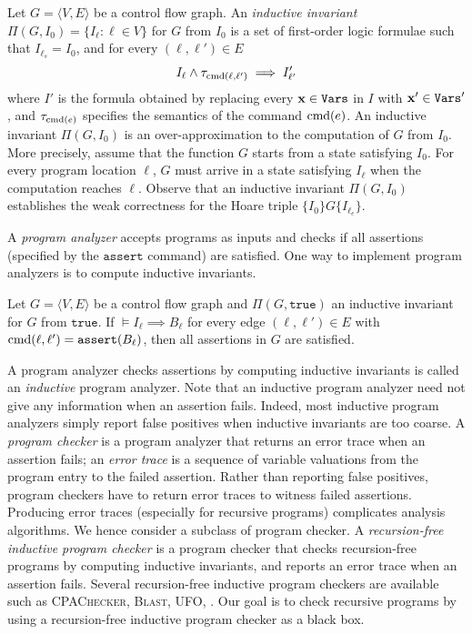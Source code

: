 Let $G = \langle V, E \rangle$ be a control flow graph.
An \emph{inductive invariant} $\Pi (G, I_0) = \{ I_\ell : \ell \in V
\}$ for $G$ from $I_0$ is a set of first-order logic formulae such
that $I_{\ell_s} = I_0$, and for every $(\ell, \ell') \in E$
\begin{equation*}
I_{\ell} \wedge \tau_{\textmd{cmd}(\ell, \ell')} \implies I'_{\ell'}
\end{equation*}
where $I'$ is the formula obtained by replacing every $\textbf{x} \in
\mathtt{Vars}$ in $I$ with $\textbf{x}' \in \mathtt{Vars}'$, and
$\tau_{\textmd{cmd} (e)}$ specifies the semantics of the command
$\textmd{cmd} (e)$. An inductive invariant $\Pi (G, I_0)$ is an
over-approximation to the computation of $G$ from $I_0$. More
precisely, assume that the function $G$ starts from a state satisfying
$I_0$. For every program location $\ell$, $G$ must arrive in a state
satisfying $I_{\ell}$ when the computation reaches $\ell$. Observe
that an inductive invariant $\Pi (G, I_0)$ establishes the weak
correctness for the Hoare triple $\{ I_0 \} G \{ I_{\ell_e} \}$.

A \emph{program analyzer} accepts programs as inputs and
checks if all assertions (specified by the $\mathtt{assert}$ command)
are satisfied. One way to implement program analyzers is to compute
inductive invariants. 
\begin{proposition}
Let $G = \langle V, E \rangle$ be a control flow
graph and $\Pi (G, \mathtt{true})$ an inductive invariant for $G$ from
$\mathtt{true}$. If $\models I_{\ell} \implies B_{\ell}$ for every
edge $(\ell, \ell') \in E$ with $\textmd{cmd} (\ell, \ell') =
\mathtt{assert} (B_{\ell})$, then all assertions in $G$ are satisfied.
\end{proposition}
A program analyzer checks assertions by computing inductive invariants
is called an \emph{inductive} program analyzer. Note that an inductive
program analyzer need not give any information when an assertion fails. 
Indeed, most inductive program analyzers simply report false positives
when inductive invariants are too coarse. A \emph{program checker} is
a program analyzer that returns an error trace when an assertion
fails; an \emph{error trace} is a sequence of variable valuations from
the program entry to the failed assertion. Rather than reporting false
positives, program checkers have to return error traces to witness 
failed assertions. Producing error traces (especially for recursive
programs) complicates analysis algorithms. We hence consider a
subclass of program checker. A \emph{recursion-free
  inductive program checker} is a program checker that checks
recursion-free programs by computing inductive invariants, and reports
an error trace when an assertion fails. Several recursion-free
inductive program checkers are available such as \textsc{CPAChecker},
\textsc{Blast}, \textsc{UFO}, \textsc{} . Our goal is to check
recursive programs by using a recursion-free inductive program checker
as a black box. 
